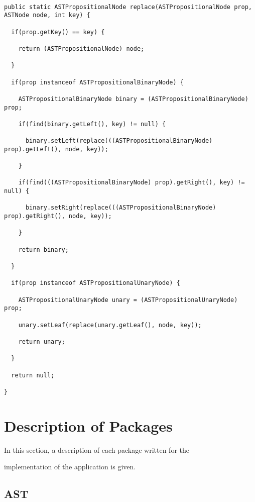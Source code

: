 \documentclass{report}
\begin{document}
\begin{lstlisting}[caption=Replace method for equivalences, label=replace]

public static ASTPropositionalNode replace(ASTPropositionalNode prop, ASTNode node, int key) {

  if(prop.getKey() == key) {

    return (ASTPropositionalNode) node;

  }

  if(prop instanceof ASTPropositionalBinaryNode) {

    ASTPropositionalBinaryNode binary = (ASTPropositionalBinaryNode) prop;

    if(find(binary.getLeft(), key) != null) {

      binary.setLeft(replace(((ASTPropositionalBinaryNode) prop).getLeft(), node, key));

    }

    if(find(((ASTPropositionalBinaryNode) prop).getRight(), key) != null) {

      binary.setRight(replace(((ASTPropositionalBinaryNode) prop).getRight(), node, key));

    }

    return binary;

  }

  if(prop instanceof ASTPropositionalUnaryNode) {

    ASTPropositionalUnaryNode unary = (ASTPropositionalUnaryNode) prop;

    unary.setLeaf(replace(unary.getLeaf(), node, key));

    return unary;

  }

  return null;

}

\end{lstlisting}



\section{Description of Packages}

In this section, a description of each package written for the

implementation of the application is given.



\subsection{AST}
\end{document}
